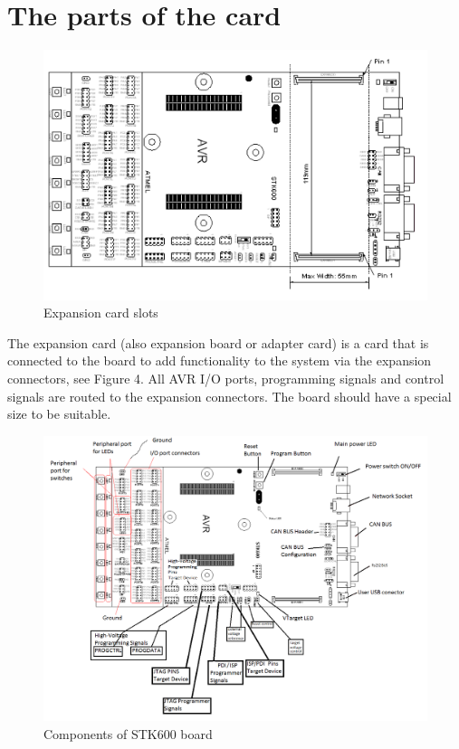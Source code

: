 \documentclass[english]{article}
\begin{document}
\section{The parts of the card}
\begin{figure}[H]
\centerline{\includegraphics[scale=0.6]{MicroLab2/expansionCard}}
\caption{Expansion card slots}
\end{figure}
The expansion card (also expansion board or adapter card) is a card that is connected to the board to add functionality to the system via the expansion connectors, see Figure 4. All AVR I/O ports, programming signals and control signals are routed to the expansion connectors. The board should have a special size to be suitable. 
\begin{figure}[H]
\centerline{\includegraphics[scale=0.3]{MicroLab2/components}}
\caption{Components of STK600 board}
\end{figure}
\end{document}
